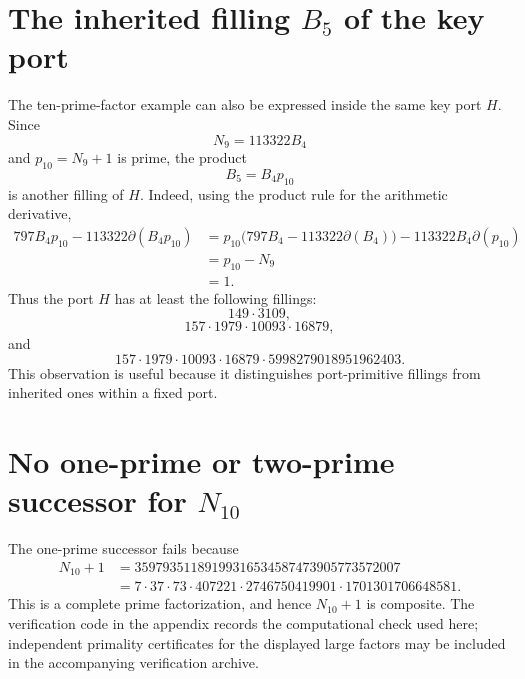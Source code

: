 \documentclass[11pt]{amsart}
\theoremstyle{plain}
\theoremstyle{definition}
\theoremstyle{remark}
\newcommand{\dd}{\partial}
\begin{document}
\section{The inherited filling \texorpdfstring{$B_5$}{B5} of the key port}

The ten-prime-factor example can also be expressed inside the same key port $H$.  Since
\[
        N_9=113322B_4
\]
and $p_{10}=N_9+1$ is prime, the product
\[
        B_5=B_4p_{10}
\]
is another filling of $H$.  Indeed, using the product rule for the arithmetic derivative,
\[
\begin{aligned}
        797B_4p_{10}-113322\dd(B_4p_{10})
        &=p_{10}\bigl(797B_4-113322\dd(B_4)\bigr)-113322B_4\dd(p_{10})\\
        &=p_{10}-N_9\\
        &=1.
\end{aligned}
\]
Thus the port $H$ has at least the following fillings:
\[
        149\cdot3109,
\]
\[
        157\cdot1979\cdot10093\cdot16879,
\]
and
\[
        157\cdot1979\cdot10093\cdot16879\cdot5998279018951962403.
\]
This observation is useful because it distinguishes port-primitive fillings from inherited ones within a fixed port.

\section{No one-prime or two-prime successor for \texorpdfstring{$N_{10}$}{N10}}

The one-prime successor fails because
\[
\begin{aligned}
        N_{10}+1
        &=35979351189199316534587473905773572007\\
        &=7\cdot37\cdot73\cdot407221\cdot2746750419901\cdot1701301706648581.
\end{aligned}
\]
This is a complete prime factorization, and hence $N_{10}+1$ is composite.  The verification code in the appendix records the computational check used here; independent primality certificates for the displayed large factors may be included in the accompanying verification archive.
\end{document}
